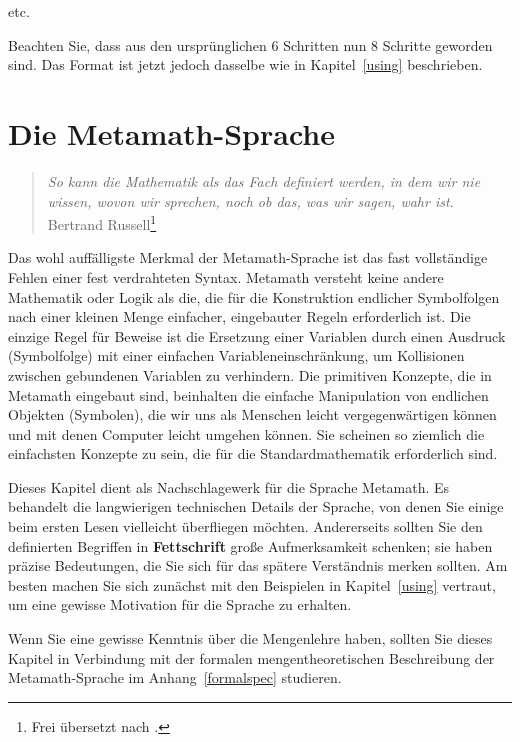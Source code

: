 \begin{center}
{etc.}
\end{center}

Beachten Sie, dass aus den ursprünglichen 6 Schritten nun 8 Schritte geworden sind.  Das Format ist jetzt jedoch dasselbe wie in Kapitel~\ref{using} beschrieben.

\chapter{Die Metamath-Sprache}
\label{languagespec}

\begin{quote}
  {\em So kann die Mathematik als das Fach definiert werden, in dem wir nie wissen, wovon wir sprechen, noch ob das, was wir sagen, wahr ist.}
      \flushright\sc  Bertrand Russell\footnote{Frei übersetzt nach \cite[S.~84]{Russell2}.}\\
\end{quote}

Das wohl auffälligste Merkmal der Metamath-Sprache ist das fast voll\-stän\-dige Fehlen einer fest verdrahteten Syntax. Metamath versteht keine andere Mathematik oder Logik als die, die für die Konstruktion endlicher Symbolfolgen nach einer kleinen Menge einfacher, eingebauter Regeln erforderlich ist.  Die einzige Regel für Beweise ist die Ersetzung einer Variablen durch einen Ausdruck (Symbolfolge) mit einer einfachen Variableneinschränkung, um Kollisionen zwischen gebundenen Variablen zu verhindern.  Die primitiven Konzepte, die in Metamath eingebaut sind, beinhalten die einfache Manipulation von endlichen Objekten (Symbolen), die wir uns als Menschen leicht vergegenwärtigen können und mit denen Computer leicht umgehen können.  Sie scheinen so ziemlich die einfachsten Konzepte zu sein, die für die Standardmathematik erforderlich sind.

Dieses Kapitel dient als Nachschlagewerk für die Sprache Metamath. Es behandelt die langwierigen technischen Details der Sprache, von denen Sie einige beim ersten Lesen vielleicht überfliegen möchten.  Andererseits sollten Sie den definierten Begriffen in {\bf Fettschrift} große Aufmerksamkeit schenken; sie haben präzise Bedeutungen, die Sie sich für das spätere Verständnis merken sollten.  Am besten machen Sie sich zunächst mit den Beispielen in Kapitel~\ref{using} vertraut, um eine gewisse Motivation für die Sprache zu erhalten.

Wenn Sie eine gewisse Kenntnis über die Mengenlehre haben, sollten Sie dieses Kapitel in Verbindung mit der formalen mengentheoretischen Beschreibung der Metamath-Sprache im Anhang~\ref{formalspec} studieren.

